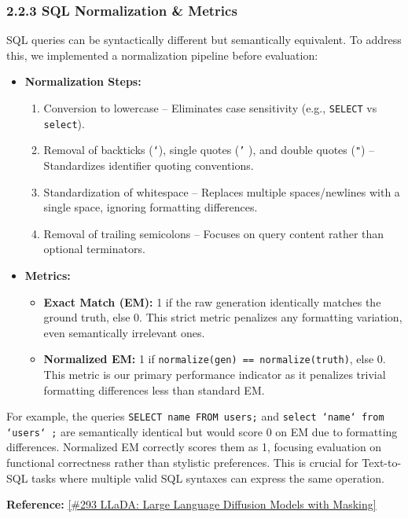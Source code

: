 \documentclass[a4paper,12pt]{article}
\begin{document}
\subsubsection*{2.2.3 SQL Normalization \& Metrics}
SQL queries can be syntactically different but semantically equivalent. To address this, we implemented a normalization pipeline before evaluation:
\begin{itemize}
\item \textbf{Normalization Steps:}
\begin{enumerate}
\item Conversion to lowercase -- Eliminates case sensitivity (e.g., \texttt{SELECT} vs \texttt{select}).
\item Removal of backticks (\texttt{`}), single quotes (\texttt{'} ), and double quotes (\texttt{"}) -- Standardizes identifier quoting conventions.
\item Standardization of whitespace -- Replaces multiple spaces/newlines with a single space, ignoring formatting differences.
\item Removal of trailing semicolons -- Focuses on query content rather than optional terminators.
\end{enumerate}
\item \textbf{Metrics:}
\begin{itemize}
\item \textbf{Exact Match (EM):} 1 if the raw generation identically matches the ground truth, else 0. This strict metric penalizes any formatting variation, even semantically irrelevant ones.
\item \textbf{Normalized EM:} 1 if \texttt{normalize(gen) == normalize(truth)}, else 0. This metric is our primary performance indicator as it penalizes trivial formatting differences less than standard EM.
\end{itemize}
\end{itemize}

For example, the queries \texttt{SELECT name FROM users;} and \texttt{select `name` from `users` ;} are semantically identical but would score 0 on EM due to formatting differences. Normalized EM correctly scores them as 1, focusing evaluation on functional correctness rather than stylistic preferences. This is crucial for Text-to-SQL tasks where multiple valid SQL syntaxes can express the same operation.

\textbf{Reference:} \href{https://www.youtube.com/watch?v=SbO6PQ69B0E}{[\#293 LLaDA: Large Language Diffusion Models with Masking]}
\end{document}
